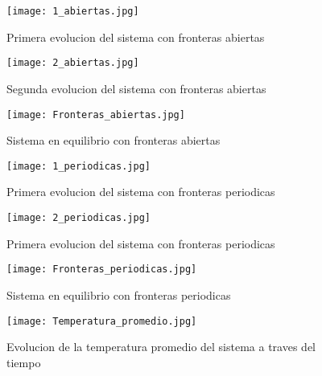 \documentclass[12pt]{article}
\begin{document}
\begin{figure}[h!]
    \centering
    \texttt{[image: 1\_abiertas.jpg]}
    \caption{Primera evolucion del sistema con fronteras abiertas}
    \label{fig6}
\end{figure}


\begin{figure}[h!]
    \centering
    \texttt{[image: 2\_abiertas.jpg]}
    \caption{Segunda evolucion del sistema con fronteras abiertas}
    \label{fig7}
\end{figure}


\begin{figure}[h!]
    \centering
    \texttt{[image: Fronteras\_abiertas.jpg]}
    \caption{Sistema en equilibrio con fronteras abiertas}
    \label{fig8}
\end{figure}


\begin{figure}[h!]
    \centering
    \texttt{[image: 1\_periodicas.jpg]}
    \caption{Primera evolucion del sistema con fronteras periodicas}
    \label{fig9}
\end{figure}


\begin{figure}[h!]
    \centering
    \texttt{[image: 2\_periodicas.jpg]}
    \caption{Primera evolucion del sistema con fronteras periodicas}
    \label{fig10}
\end{figure}

\begin{figure}[h!]
    \centering
    \texttt{[image: Fronteras\_periodicas.jpg]}
    \caption{Sistema en equilibrio con fronteras periodicas}
    \label{fig11}
\end{figure}


\begin{figure}[h!]
    \centering
    \texttt{[image: Temperatura\_promedio.jpg]}
    \caption{Evolucion de la temperatura promedio del sistema a traves del tiempo}
    \label{fig13}
\end{figure}
\end{document}
